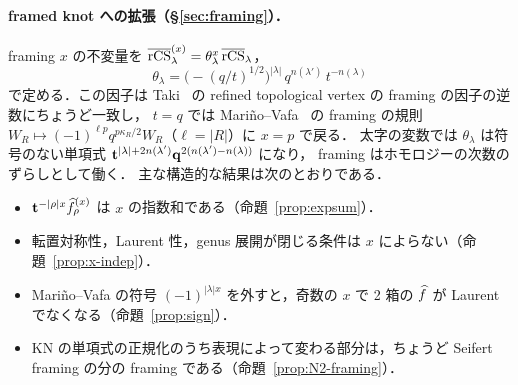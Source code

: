 \paragraph{framed knot への拡張（\S\ref{sec:framing}）．}
framing $x$ の不変量を $\overline{\textrm{rCS}}^{(x)}_\lambda=\theta_\lambda^x\,\overline{\textrm{rCS}}_\lambda$，
\[
\theta_\lambda=\bigl(-(q/t)^{1/2}\bigr)^{|\lambda|}\,q^{n(\lambda')}\,t^{-n(\lambda)}
\]
で定める．この因子は Taki~\cite{Taki07} の refined topological vertex の framing の因子の逆数にちょうど一致し，
$t=q$ では Mariño--Vafa~\cite{Marino01} の framing の規則 $W_R\mapsto(-1)^{\ell p}q^{p\kappa_R/2}W_R$（$\ell=|R|$）に $x=p$ で戻る．
太字の変数では $\theta_\lambda$ は符号のない単項式 $\mathbf{t}^{|\lambda|+2n(\lambda')}\mathbf{q}^{2(n(\lambda')-n(\lambda))}$ になり，
framing はホモロジーの次数のずらしとして働く．
主な構造的な結果は次のとおりである．
\begin{itemize}
\item $\mathbf{t}^{-|\rho|x}\widehat{f}^{(x)}_\rho$ は $x$ の指数和である（命題~\ref{prop:expsum}）．
\item 転置対称性，Laurent 性，genus 展開が閉じる条件は $x$ によらない（命題~\ref{prop:x-indep}）．
\item Mariño--Vafa の符号 $(-1)^{|\lambda|x}$ を外すと，奇数の $x$ で 2 箱の $\widehat{f}$ が Laurent でなくなる（命題~\ref{prop:sign}）．
\item KN の単項式の正規化のうち表現によって変わる部分は，ちょうど Seifert framing の分の framing である（命題~\ref{prop:N2-framing}）．
\end{itemize}

